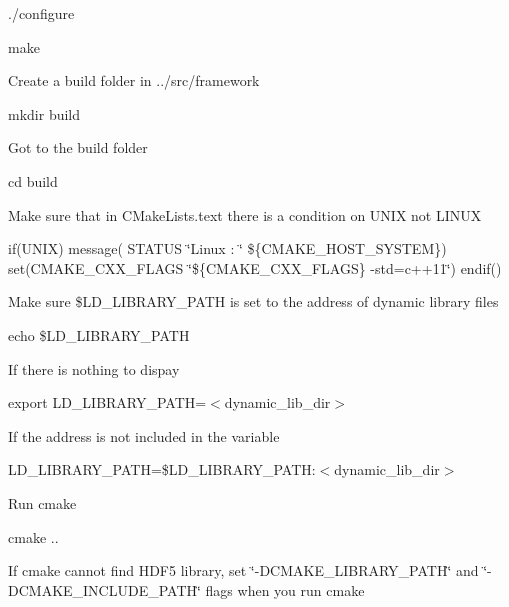 \begin{DoxyEnumerate}
\begin{DoxyItemize}
\item ./configure
\item make
\end{DoxyItemize}
\item Create a build folder in ../src/framework
\begin{DoxyItemize}
\item mkdir build
\item Got to the build folder
\begin{DoxyItemize}
\item cd build
\end{DoxyItemize}
\item Make sure that in C\+Make\+Lists.\+text there is a condition on U\+N\+IX not L\+I\+N\+UX
\begin{DoxyItemize}
\item if(\+U\+N\+I\+X) message( S\+T\+A\+T\+US \char`\"{}\+Linux \+: \char`\"{} \$\{C\+M\+A\+K\+E\+\_\+\+H\+O\+S\+T\+\_\+\+S\+Y\+S\+T\+EM\}) set(C\+M\+A\+K\+E\+\_\+\+C\+X\+X\+\_\+\+F\+L\+A\+GS \char`\"{}\$\{\+C\+M\+A\+K\+E\+\_\+\+C\+X\+X\+\_\+\+F\+L\+A\+G\+S\} -\/std=c++11\char`\"{}) endif()
\end{DoxyItemize}
\item Make sure \$\+L\+D\+\_\+\+L\+I\+B\+R\+A\+R\+Y\+\_\+\+P\+A\+TH is set to the address of dynamic library files
\begin{DoxyItemize}
\item echo \$\+L\+D\+\_\+\+L\+I\+B\+R\+A\+R\+Y\+\_\+\+P\+A\+TH
\item If there is nothing to dispay
\begin{DoxyItemize}
\item export L\+D\+\_\+\+L\+I\+B\+R\+A\+R\+Y\+\_\+\+P\+A\+TH=$<$dynamic\+\_\+lib\+\_\+dir$>$
\end{DoxyItemize}
\item If the address is not included in the variable
\begin{DoxyItemize}
\item L\+D\+\_\+\+L\+I\+B\+R\+A\+R\+Y\+\_\+\+P\+A\+TH=\$\+L\+D\+\_\+\+L\+I\+B\+R\+A\+R\+Y\+\_\+\+P\+A\+TH\+:$<$dynamic\+\_\+lib\+\_\+dir$>$
\end{DoxyItemize}
\end{DoxyItemize}
\item Run cmake
\begin{DoxyItemize}
\item cmake ..
\item If cmake cannot find H\+D\+F5 library, set \char`\"{}-\/\+D\+C\+M\+A\+K\+E\+\_\+\+L\+I\+B\+R\+A\+R\+Y\+\_\+\+P\+A\+T\+H\char`\"{} and \char`\"{}-\/\+D\+C\+M\+A\+K\+E\+\_\+\+I\+N\+C\+L\+U\+D\+E\+\_\+\+P\+A\+T\+H\char`\"{} flags when you run cmake

\end{DoxyItemize}
\end{DoxyItemize}
\end{DoxyEnumerate}
